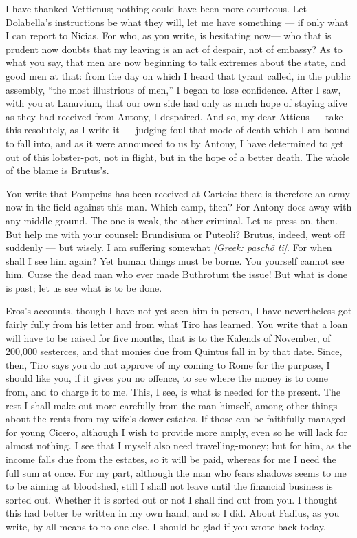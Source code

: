 

 I have thanked Vettienus; nothing could have been more courteous. Let Dolabella's instructions be what they will, let me have something --- if only what I can report to Nicias. For who, as you write, \dag is hesitating now\dag --- who that is prudent now doubts that my leaving is an act of despair, not of embassy? As to what you say, that men are now beginning to talk extremes about the state, and good men at that: from the day on which I heard that tyrant called, in the public assembly, ``the most illustrious of men,'' I began to lose confidence. After I saw, with you at Lanuvium, that our own side had only as much hope of staying alive as they had received from Antony, I despaired. And so, my dear Atticus --- take this resolutely, as I write it --- judging foul that mode of death which \dag I am bound to fall into\dag, and as it were announced to us by Antony, I have determined to get out of this lobster-pot, not in flight, but in the hope of a better death. The whole of the blame is Brutus's.

 You write that Pompeius has been received at Carteia: there is therefore an army now in the field against this man. Which camp, then? For Antony does away with any middle ground. The one is weak, the other criminal. Let us press on, then. But help me with your counsel: Brundisium or Puteoli? Brutus, indeed, went off suddenly --- but wisely. I am suffering somewhat \textit{[Greek: pasch\=o ti]}. For when shall I see him again? Yet human things must be borne. You yourself cannot see him. Curse the dead man who ever made Buthrotum the issue! But what is done is past; let us see what is to be done.

 Eros's accounts, though I have not yet seen him in person, I have nevertheless got fairly fully from his letter and from what Tiro has learned. You write that a loan will have to be raised for five months, that is to the Kalends of November, of 200,000 sesterces, and that monies due from Quintus fall in by that date. Since, then, Tiro says you do not approve of my coming to Rome for the purpose, I should like you, if it gives you no offence, to see where the money is to come from, and to charge it to me. This, I see, is what is needed for the present. The rest I shall make out more carefully from the man himself, among other things about the rents from my wife's dower-estates. If those can be faithfully managed for young Cicero, although I wish to provide more amply, even so he will lack for almost nothing. I see that I myself also need travelling-money; but for him, as the income falls due from the estates, so it will be paid, whereas for me I need the full sum at once. For my part, although the man who fears shadows seems to me to be aiming at bloodshed, still I shall not leave until the financial business is sorted out. Whether it is sorted out or not I shall find out from you. I thought this had better be written in my own hand, and so I did. About Fadius, as you write, by all means to no one else. I should be glad if you wrote back today.
